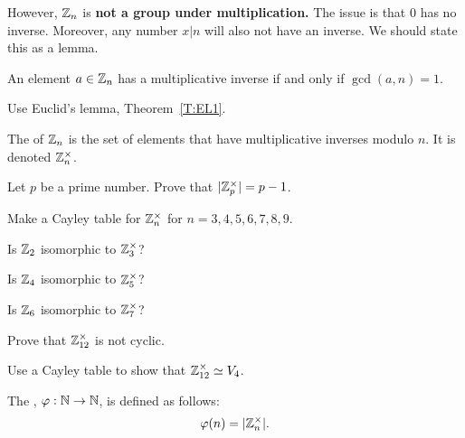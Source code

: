 \documentclass{ximera}
\begin{document}
However, $\mathbb Z_n$ is \textbf{not a group under multiplication.} The
issue is that $0$ has no inverse. Moreover, any number $x|n$ will also
not have an inverse. We should state this as a lemma.

\begin{lemma}\label{L:mi}
  An element $a\in\mathbb Z_n$ has a multiplicative inverse if and only if
  $\gcd(a,n) = 1$.
  \begin{sketch}
    Use Euclid's lemma, Theorem~\ref{T:EL1}.
  \end{sketch}
\end{lemma}

\begin{definition}
  The  of $\mathbb Z_n$ is the set of elements that
  have multiplicative inverses modulo $n$. It is denoted
  $\mathbb Z_n^\times$.
\end{definition}


\begin{exercise}
  Let $p$ be a prime number. Prove that $|\mathbb Z_p^\times| = p-1$.
\end{exercise}


\begin{exercise}
  Make a Cayley table for $\mathbb Z_n^\times$ for $n = 3,4,5,6,7,8,9$.
\end{exercise}

\begin{exercise}
  Is $\mathbb Z_2$ isomorphic to $\mathbb Z_3^\times$?
\end{exercise}


\begin{exercise}
  Is $\mathbb Z_4$ isomorphic to $\mathbb Z_5^\times$?
\end{exercise}

\begin{exercise}
  Is $\mathbb Z_6$ isomorphic to $\mathbb Z_7^\times$?
\end{exercise}


\begin{exercise}
  Prove that $\mathbb Z_{12}^\times$ is not cyclic.
\end{exercise}

\begin{exercise}
  Use a Cayley table to show that $\mathbb Z^\times_{12}\simeq V_4$.
\end{exercise}


\begin{definition}
  The , $\eulerphi:\N\to\N$, is defined as
  follows:
  \[
  \eulerphi(n) = |\Z_n^\times|.
  \]
\end{definition}
\end{document}
